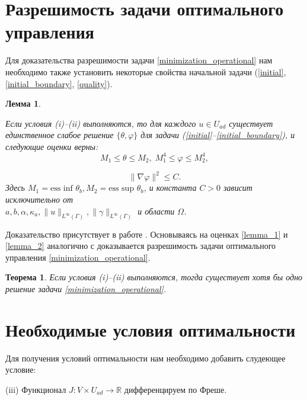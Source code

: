 \documentclass[12pt,a4paper]{article}%
\newtheorem{theorem}{Теорема}
\newtheorem{lemma}{Лемма}
\begin{document}
\section{Разрешимость задачи оптимального управления}
    Для доказательства разрешимости задачи \eqref{minimization_operational} нам необходимо также установить некоторые свойства начальной задачи (\ref{initial}, \ref{initial_boundary}, \ref{quality}).

    \begin{lemma}
    \label{SolvabilityLemma}

    Если условия (i)--(ii) выполняются, то для каждого $ u \in U_{ad} $ существует единственное слабое решение $\{\theta, \varphi \}$ для задачи (\ref{initial}--\ref{initial_boundary}), и следующие оценки верны:
    \begin{equation}
        \label{lemma_1}
     M_1 \le \theta \le M_2, \; M_1^4 \le \varphi \le M_2^4,
     \end{equation}

    \begin{equation}
    \label{lemma_2}
     \| \nabla \varphi \|^2 \le C.
     \end{equation}
    Здесь $M_1 = \text{ess inf } \theta_b, M_2 = \text{ess sup } \theta_b$, и константа $C > 0$ зависит исключительно от \\ $a, b, \alpha, \kappa_a, \|u\|_{L^\infty(\Gamma)}, \| \gamma \|_{L^\infty(\Gamma)}$ и области $\Omega$.
    \end{lemma}
    Доказательство присутствует в работе \cite{lemma_proof}.
    Основываясь на оценках \eqref{lemma_1} и \eqref{lemma_2} аналогично с \cite{theorem_2_proof} доказывается разрешимость задачи оптимального управления \eqref{minimization_operational}.

    \begin{theorem}
        Если условия (i)--(ii) выполняются, тогда существует хотя бы одно решение задачи \eqref{minimization_operational}.
    \end{theorem}

\section{Необходимые условия оптимальности}
\label{sec:optimality}
    Для получения условий оптимальности нам необходимо добавить слудеющее условие:

    (iii) Функционал $J : V \times U_{ad} \rightarrow \mathbb{R}$ дифференцируем по Фреше.
\end{document}
